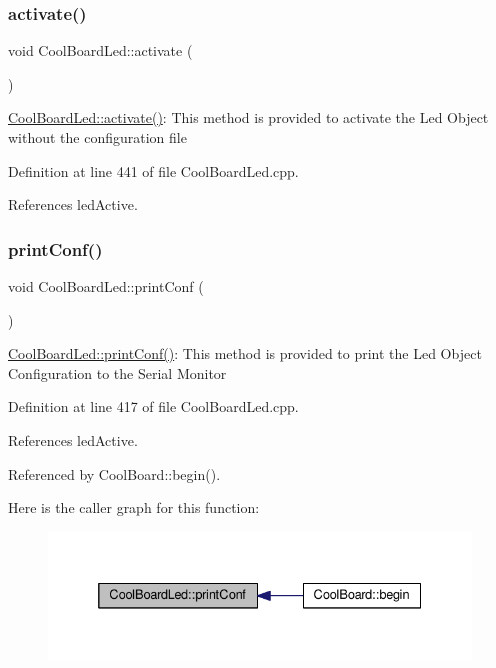 \subsubsection{\texorpdfstring{activate()}{activate()}}
{\footnotesize\ttfamily void Cool\+Board\+Led\+::activate (\begin{DoxyParamCaption}{ }\end{DoxyParamCaption})}

\hyperlink{class_cool_board_led_ae74fe4b47d06c3a97b468ba220c4eb99}{Cool\+Board\+Led\+::activate()}\+: This method is provided to activate the Led Object without the configuration file 

Definition at line 441 of file Cool\+Board\+Led.\+cpp.



References led\+Active.

\mbox{\label{class_cool_board_led_a8ed3053a36f0ed4a131f43b5b17efb61}} 
\subsubsection{\texorpdfstring{print\+Conf()}{printConf()}}
{\footnotesize\ttfamily void Cool\+Board\+Led\+::print\+Conf (\begin{DoxyParamCaption}{ }\end{DoxyParamCaption})}

\hyperlink{class_cool_board_led_a8ed3053a36f0ed4a131f43b5b17efb61}{Cool\+Board\+Led\+::print\+Conf()}\+: This method is provided to print the Led Object Configuration to the Serial Monitor 

Definition at line 417 of file Cool\+Board\+Led.\+cpp.



References led\+Active.



Referenced by Cool\+Board\+::begin().

Here is the caller graph for this function\+:
\nopagebreak
\begin{figure}[H]
\begin{center}
\leavevmode
\includegraphics[width=332pt]{de/dc0/class_cool_board_led_a8ed3053a36f0ed4a131f43b5b17efb61_icgraph}
\end{center}
\end{figure}
\mbox{\label{class_cool_board_led_af1cacbaa88db8bcf6042c1083ba41155}} 
